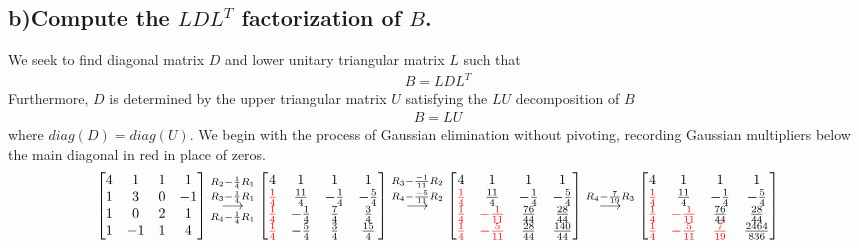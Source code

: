 \documentclass[11pt, letterpaper]{article}
\begin{document}
\subsection*{b)\normalfont Compute the $LDL^T$ factorization of $B$.}
We seek to find diagonal matrix $D$ and lower unitary triangular matrix $L$ such that
\begin{align*}
    B=LDL^T
\end{align*}
Furthermore, $D$ is determined by the upper triangular matrix $U$ satisfying the $LU$ decomposition of $B$
\begin{align*}
    B=LU
\end{align*}
where $diag(D)=diag(U)$. We begin with the process of Gaussian elimination without pivoting, recording Gaussian
multipliers below the main diagonal in {\color{red}red} in place of zeros.
\begin{align*}
    \begin{bmatrix}
        4 & 1 & 1 & 1\\
        1 & 3 & 0 & -1\\
        1 & 0 & 2 & 1\\
        1 & -1 & 1 & 4    
    \end{bmatrix}
    \overset{R_2-\frac{1}{4}R_1}{\overset{R_3-\frac{1}{4}R_1}{\underset{R_4-\frac{1}{4}R_1}{\longrightarrow}}}
    \begin{bmatrix}
        4 & 1 & 1 & 1\\
        {\color{red}\frac{1}{4}} & \frac{11}{4} & -\frac{1}{4} & -\frac{5}{4}\\
        {\color{red}\frac{1}{4}}  & -\frac{1}{4} & \frac{7}{4} & \frac{3}{4}\\
        {\color{red}\frac{1}{4}}  & -\frac{5}{4} & \frac{3}{4} & \frac{15}{4}    
    \end{bmatrix}
    \overset{R_3-\frac{-1}{11}R_2}{\overset{R_4-\frac{-5}{11}R_2}{\longrightarrow}}
    \begin{bmatrix}
        4 & 1 & 1 & 1\\
        {\color{red}\frac{1}{4}} & \frac{11}{4} & -\frac{1}{4} & -\frac{5}{4}\\
        {\color{red}\frac{1}{4}}  & {\color{red}-\frac{1}{11}} & \frac{76}{44} & \frac{28}{44}\\
        {\color{red}\frac{1}{4}}  & {\color{red}-\frac{5}{11}} & \frac{28}{44} & \frac{140}{44}    
    \end{bmatrix}
    \overset{R_4-\frac{7}{19}R_3}{\longrightarrow}
    \begin{bmatrix}
        4 & 1 & 1 & 1\\
        {\color{red}\frac{1}{4}} & \frac{11}{4} & -\frac{1}{4} & -\frac{5}{4}\\
        {\color{red}\frac{1}{4}}  & {\color{red}-\frac{1}{11}} & \frac{76}{44} & \frac{28}{44}\\
        {\color{red}\frac{1}{4}}  & {\color{red}-\frac{5}{11}} & {\color{red}\frac{7}{19}} & \frac{2464}{836}    
    \end{bmatrix}
\end{align*}
\end{document}
